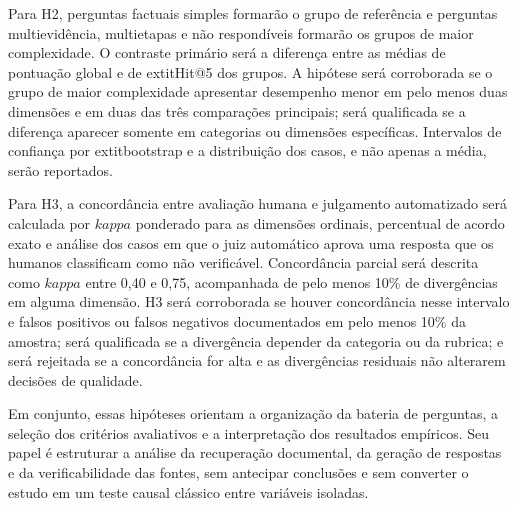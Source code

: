 Para H2, perguntas factuais simples formarão o grupo de referência e perguntas multievidência, multietapas e não respondíveis formarão os grupos de maior complexidade. O contraste primário será a diferença entre as médias de pontuação global e de 	extit{Hit@5} dos grupos. A hipótese será corroborada se o grupo de maior complexidade apresentar desempenho menor em pelo menos duas dimensões e em duas das três comparações principais; será qualificada se a diferença aparecer somente em categorias ou dimensões específicas. Intervalos de confiança por 	extit{bootstrap} e a distribuição dos casos, e não apenas a média, serão reportados.

Para H3, a concordância entre avaliação humana e julgamento automatizado será calculada por $kappa$ ponderado para as dimensões ordinais, percentual de acordo exato e análise dos casos em que o juiz automático aprova uma resposta que os humanos classificam como não verificável. Concordância parcial será descrita como $kappa$ entre 0,40 e 0,75, acompanhada de pelo menos 10\% de divergências em alguma dimensão. H3 será corroborada se houver concordância nesse intervalo e falsos positivos ou falsos negativos documentados em pelo menos 10\% da amostra; será qualificada se a divergência depender da categoria ou da rubrica; e será rejeitada se a concordância for alta e as divergências residuais não alterarem decisões de qualidade.

Em conjunto, essas hipóteses orientam a organização da bateria de perguntas, a seleção dos critérios avaliativos e a interpretação dos resultados empíricos. Seu papel é estruturar a análise da recuperação documental, da geração de respostas e da verificabilidade das fontes, sem antecipar conclusões e sem converter o estudo em um teste causal clássico entre variáveis isoladas.
